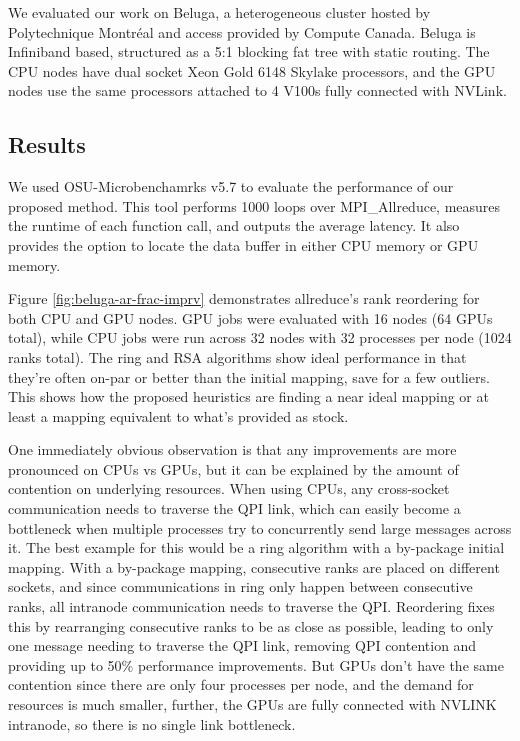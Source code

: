 We evaluated our work on Beluga, a heterogeneous cluster hosted by Polytechnique Montréal and access provided by Compute Canada. 
Beluga is Infiniband based, structured as a 5:1 blocking fat tree with static routing.  
The CPU nodes have dual socket Xeon Gold 6148 Skylake processors, and the GPU nodes use the same processors attached to 4 V100s fully connected with NVLink.

\subsection{Results}





We used OSU-Microbenchamrks v5.7 \cite{Bureddy2012OMB} to evaluate the performance of our proposed method. 
This tool performs 1000 loops over MPI\_Allreduce, measures the runtime of each function call, and outputs the average latency. 
It also provides the option to locate the data buffer in either CPU memory or GPU memory.

Figure \ref{fig:beluga-ar-frac-imprv} demonstrates allreduce's rank reordering for both CPU and GPU nodes.
GPU jobs were evaluated with 16 nodes (64 GPUs total), while CPU jobs were run across 32 nodes with 32 processes per node (1024 ranks total).
The ring and RSA algorithms show ideal performance in that they're often on-par or better than the initial mapping, save for a few outliers.
This shows how the proposed heuristics are finding a near ideal mapping or at least a mapping equivalent to what's provided as stock.  

One immediately obvious observation is that any improvements are more pronounced on CPUs vs GPUs, but it can be explained by the amount of contention on underlying resources.
When using CPUs, any cross-socket communication needs to traverse the QPI link, which can easily become a bottleneck when multiple processes try to concurrently send large messages across it.
The best example for this would be a ring algorithm with a by-package initial mapping.
With a by-package mapping, consecutive ranks are placed on different sockets, and since communications in ring only happen between consecutive ranks, all intranode communication needs to traverse the QPI.
Reordering fixes this by rearranging consecutive ranks to be as close as possible, leading to only one message needing to traverse the QPI link, removing QPI contention and providing up to 50\% performance improvements. 
But GPUs don't have the same contention since there are only four processes per node, and the demand for resources is much smaller, further, the GPUs are fully connected with NVLINK intranode, so there is no single link bottleneck.

